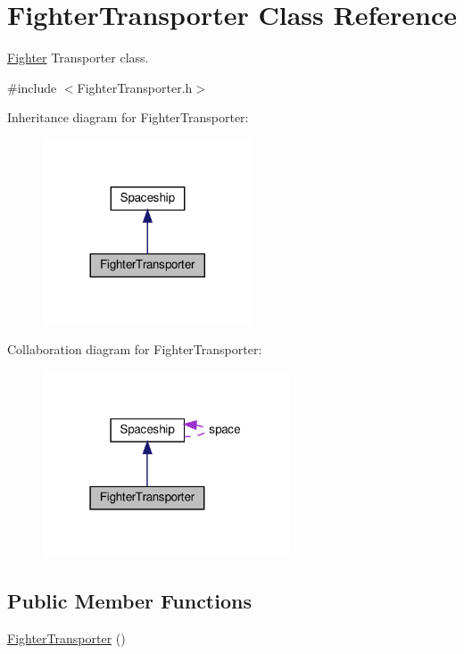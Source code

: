 \hypertarget{classFighterTransporter}{}\section{Fighter\+Transporter Class Reference}
\label{classFighterTransporter}


\hyperlink{classFighter}{Fighter} Transporter class.  




{\ttfamily \#include $<$Fighter\+Transporter.\+h$>$}



Inheritance diagram for Fighter\+Transporter\+:\nopagebreak
\begin{figure}[H]
\begin{center}
\leavevmode
\includegraphics[width=176pt]{classFighterTransporter__inherit__graph}
\end{center}
\end{figure}


Collaboration diagram for Fighter\+Transporter\+:\nopagebreak
\begin{figure}[H]
\begin{center}
\leavevmode
\includegraphics[width=207pt]{classFighterTransporter__coll__graph}
\end{center}
\end{figure}
\subsection*{Public Member Functions}
\begin{DoxyCompactItemize}
\item 
\hyperlink{classFighterTransporter_ad8e296a192f6a5550d15ec2d3a74c4b8}{Fighter\+Transporter} ()
\end{DoxyCompactItemize}
